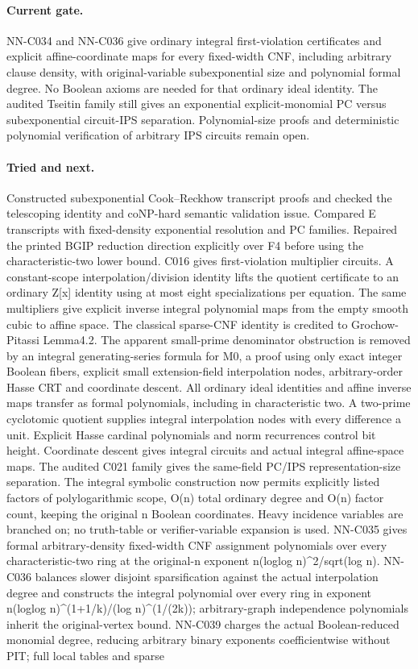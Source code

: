\paragraph{Current gate.} NN-C034 and NN-C036 give ordinary integral first-violation certificates and explicit affine-coordinate maps for every fixed-width CNF, including arbitrary clause density, with original-variable subexponential size and polynomial formal degree. No Boolean axioms are needed for that ordinary ideal identity. The audited Tseitin family still gives an exponential explicit-monomial PC versus subexponential circuit-IPS separation. Polynomial-size proofs and deterministic polynomial verification of arbitrary IPS circuits remain open.
\paragraph{Tried and next.} Constructed subexponential Cook--Reckhow transcript proofs and checked the telescoping identity and coNP-hard semantic validation issue. Compared E transcripts with fixed-density exponential resolution and PC families. Repaired the printed BGIP reduction direction explicitly over F4 before using the characteristic-two lower bound. C016 gives first-violation multiplier circuits. A constant-scope interpolation/division identity lifts the quotient certificate to an ordinary Z[x] identity using at most eight specializations per equation. The same multipliers give explicit inverse integral polynomial maps from the empty smooth cubic to affine space. The classical sparse-CNF identity is credited to Grochow-Pitassi Lemma4.2. The apparent small-prime denominator obstruction is removed by an integral generating-series formula for M0, a proof using only exact integer Boolean fibers, explicit small extension-field interpolation nodes, arbitrary-order Hasse CRT and coordinate descent. All ordinary ideal identities and affine inverse maps transfer as formal polynomials, including in characteristic two. A two-prime cyclotomic quotient supplies integral interpolation nodes with every difference a unit. Explicit Hasse cardinal polynomials and norm recurrences control bit height. Coordinate descent gives integral circuits and actual integral affine-space maps. The audited C021 family gives the same-field PC/IPS representation-size separation. The integral symbolic construction now permits explicitly listed factors of polylogarithmic scope, O(n) total ordinary degree and O(n) factor count, keeping the original n Boolean coordinates. Heavy incidence variables are branched on; no truth-table or verifier-variable expansion is used. NN-C035 gives formal arbitrary-density fixed-width CNF assignment polynomials over every characteristic-two ring at the original-n exponent n(loglog n)\textasciicircum{}2/sqrt(log n). NN-C036 balances slower disjoint sparsification against the actual interpolation degree and constructs the integral polynomial over every ring in exponent n(loglog n)\textasciicircum{}(1+1/k)/(log n)\textasciicircum{}(1/(2k)); arbitrary-graph independence polynomials inherit the original-vertex bound. NN-C039 charges the actual Boolean-reduced monomial degree, reducing arbitrary binary exponents coefficientwise without PIT; full local tables and sparse 